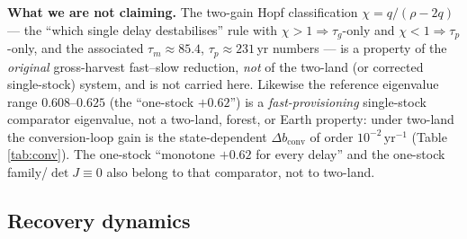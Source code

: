 \documentclass[11pt]{article}
\begin{document}
\noindent\textbf{What we are not claiming.} The two-gain Hopf classification $\chi=q/(\rho-2q)$ --- the ``which
single delay destabilises'' rule with $\chi>1\Rightarrow\tau_g$-only and $\chi<1\Rightarrow\tau_p$-only, and the
associated $\tau_m\approx85.4$, $\tau_p\approx231$\,yr numbers --- is a property of the \emph{original}
gross-harvest fast--slow reduction, \emph{not} of the two-land (or corrected single-stock) system, and is not
carried here. Likewise the reference eigenvalue range $0.608$--$0.625$ (the ``one-stock $+0.62$'') is a
\emph{fast-provisioning} single-stock comparator eigenvalue, not a two-land, forest, or Earth property: under
two-land the conversion-loop gain is the state-dependent $\Delta b_{\mathrm{conv}}$ of order
$10^{-2}\,\text{yr}^{-1}$ (Table \ref{tab:conv}). The one-stock ``monotone $+0.62$ for every delay'' and the
one-stock family/$\det J\equiv0$ also belong to that comparator, not to two-land.

\subsection{Recovery dynamics}
\end{document}
